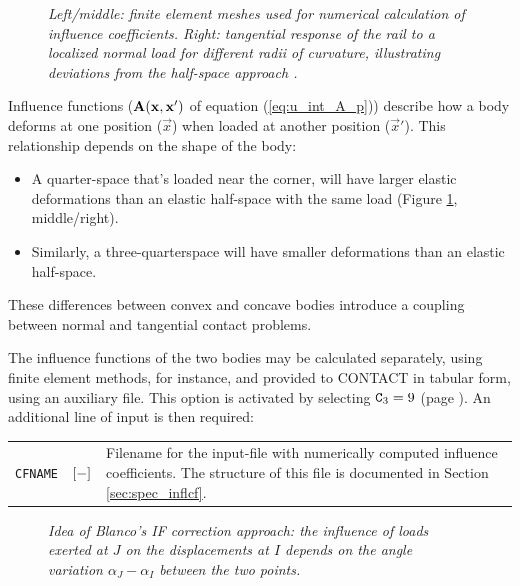 \documentclass[12pt]{report}
\newenvironment{inputvars}{\vspace{0.4\baselineskip}%

\begin{tabular}{>{\raggedright}p{22mm}p{19mm}p{113mm}}}{
\end{tabular}

}
\newcommand{\inpvar}[3]{{\small\tt #1} & $#2$ & #3 \\[1ex]}
\begin{document}
\begin{figure}[bt]
\centering
{}
\hspace{5mm}
\hspace{5mm}
\caption{\em Left/middle: finite element meshes used for numerical
        calculation of influence coefficients. Right: tangential
        response of the rail to a localized normal load for different radii
        of curvature, illustrating deviations from the half-space approach
        \cite{Vollebregt2014d-conformal}.}
\label{fig:quasiquart_mesh}
\end{figure}

Influence functions ($\mathbf{A}(\mathbf{x},\mathbf{x}')$ of equation
(\ref{eq:u_int_A_p})) describe how a body deforms at one position
($\vec{x}$) when loaded at another position ($\vec{x}'$). This relationship
depends on the shape of the body:
\begin{itemize}
\item A quarter-space that's loaded near the corner, will have larger
        elastic deformations than an elastic half-space with the same load
        (Figure \ref{fig:quasiquart_mesh}, middle/right).
\item Similarly, a three-quarterspace will have smaller deformations than
        an elastic half-space.
\end{itemize}
These differences between convex and concave bodies introduce a coupling
between normal and tangential contact problems.

The influence functions of the two bodies may be calculated separately,
using finite element methods, for instance, and provided to CONTACT in
tabular form, using an auxiliary file. This option is activated by
selecting ${\tt C}_3=9$ (page \pageref{c3-digit}). An additional line of
input is then required:
\begin{inputvars}
\inpvar{CFNAME}{\bunit{-}}{Filename for the input-file with numerically computed
        influence coefficients. The structure of this file is documented
        in Section \ref{sec:spec_inflcf}.}
\end{inputvars}

\begin{figure}[bt]
\centering
{}
\caption{\em Idea of Blanco's IF correction approach: the influence of
        loads exerted at $J$ on the displacements at $I$ depends on the
        angle variation $\alpha_J-\alpha_I$ between the two points.}
\label{fig:blanco-if}
\end{figure}
\end{document}
